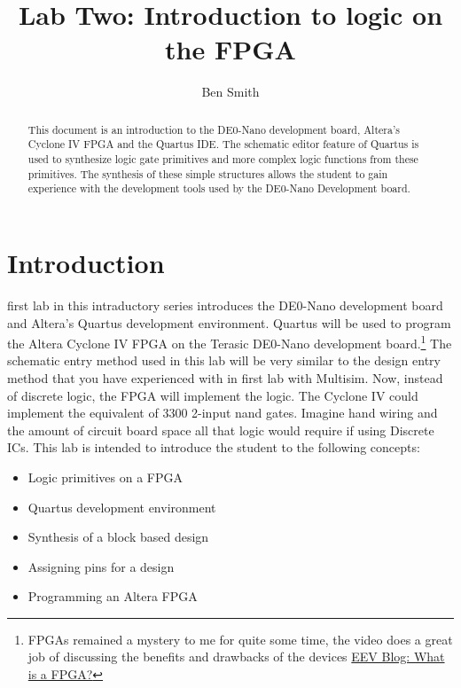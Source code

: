 \title{Lab Two: Introduction to logic on the FPGA}
\author{Ben Smith}



\maketitle

  \begin{abstract}
    This document is an introduction to the DE0-Nano development board, Altera's Cyclone IV FPGA and the Quartus IDE. The schematic editor feature of Quartus is used to synthesize logic gate primitives and more complex logic functions from these primitives. The synthesis of these simple structures allows the student to gain experience with the development tools used by the DE0-Nano Development board.
  \end{abstract}

  \section{Introduction}
     first lab in this intraductory series introduces the DE0-Nano development board and Altera's Quartus development environment. Quartus will be used to program the Altera Cyclone IV FPGA on the Terasic DE0-Nano development board.\footnote{FPGAs remained a mystery to me for quite some time, the video does a great job of discussing the benefits and drawbacks of the devices \href{https://www.youtube.com/watch?v=gUsHwi4M4xE}{EEV Blog: What is a FPGA?}}  The schematic entry method used in this lab will be very similar to the design entry method that you have experienced with in first lab with Multisim. Now, instead of discrete logic, the FPGA will implement the logic. The Cyclone IV could implement the equivalent of 3300 2-input nand gates. Imagine hand wiring and the amount of circuit board space all that logic would require if using Discrete ICs. This lab is intended to introduce the student to the following concepts:
    \begin{itemize}
       \item Logic primitives on a FPGA
       \item Quartus development environment
       \item Synthesis of a block based design
       \item Assigning pins for a design
       \item Programming an Altera FPGA
    \end{itemize}

